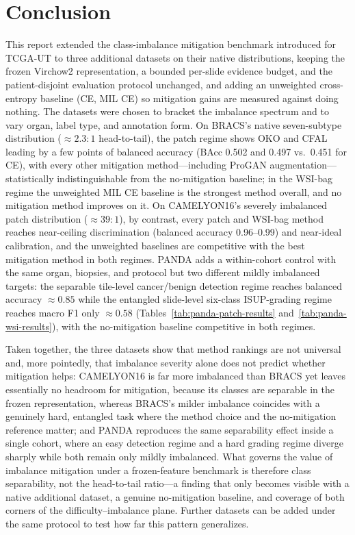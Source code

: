 \documentclass[11pt]{article}
\begin{document}
\section{Conclusion}
\label{sec:conclusion}
This report extended the class-imbalance mitigation benchmark introduced for TCGA-UT \citep{queisler2026imbalanceTCGA} to three additional datasets on their native distributions, keeping the frozen Virchow2 representation, a bounded per-slide evidence budget, and the patient-disjoint evaluation protocol unchanged, and adding an unweighted cross-entropy baseline (CE, MIL CE) so mitigation gains are measured against doing nothing. The datasets were chosen to bracket the imbalance spectrum and to vary organ, label type, and annotation form. On BRACS's native seven-subtype distribution (${\approx}2.3{:}1$ head-to-tail), the patch regime shows OKO and CFAL leading by a few points of balanced accuracy (BAcc \num{0.502} and \num{0.497} vs.\ \num{0.451} for CE), with every other mitigation method---including ProGAN augmentation---statistically indistinguishable from the no-mitigation baseline; in the WSI-bag regime the unweighted MIL CE baseline is the strongest method overall, and no mitigation method improves on it. On CAMELYON16's severely imbalanced patch distribution (${\approx}39{:}1$), by contrast, every patch and WSI-bag method reaches near-ceiling discrimination (balanced accuracy \num{0.96}--\num{0.99}) and near-ideal calibration, and the unweighted baselines are competitive with the best mitigation method in both regimes. PANDA adds a within-cohort control with the same organ, biopsies, and protocol but two different mildly imbalanced targets: the separable tile-level cancer/benign detection regime reaches balanced accuracy ${\approx}\num{0.85}$ while the entangled slide-level six-class ISUP-grading regime reaches macro F1 only ${\approx}\num{0.58}$ (Tables~\ref{tab:panda-patch-results} and~\ref{tab:panda-wsi-results}), with the no-mitigation baseline competitive in both regimes.

Taken together, the three datasets show that method rankings are not universal and, more pointedly, that imbalance severity alone does not predict whether mitigation helps: CAMELYON16 is far more imbalanced than BRACS yet leaves essentially no headroom for mitigation, because its classes are separable in the frozen representation, whereas BRACS's milder imbalance coincides with a genuinely hard, entangled task where the method choice and the no-mitigation reference matter; and PANDA reproduces the same separability effect inside a single cohort, where an easy detection regime and a hard grading regime diverge sharply while both remain only mildly imbalanced. What governs the value of imbalance mitigation under a frozen-feature benchmark is therefore class separability, not the head-to-tail ratio---a finding that only becomes visible with a native additional dataset, a genuine no-mitigation baseline, and coverage of both corners of the difficulty--imbalance plane. Further datasets can be added under the same protocol to test how far this pattern generalizes.

\clearpage


\end{document}

